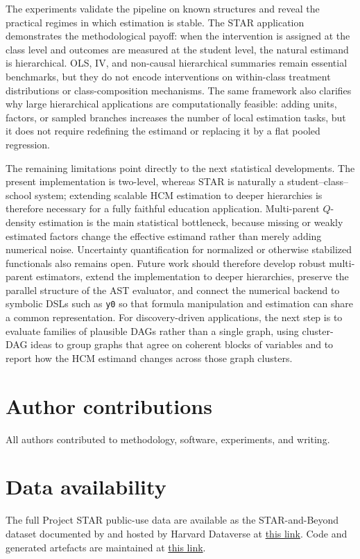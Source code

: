 \documentclass[unnumsec,webpdf,contemporary,large]{oup-authoring-template}%
\theoremstyle{thmstyleone}%
\theoremstyle{thmstyletwo}%
\theoremstyle{thmstylethree}%
\begin{document}
The experiments validate the pipeline on known structures and reveal the practical regimes in which estimation is stable.
The STAR application demonstrates the methodological payoff: when the intervention is assigned at the class level and outcomes are measured at the student level, the natural estimand is hierarchical.
OLS, IV, and non-causal hierarchical summaries remain essential benchmarks, but they do not encode interventions on within-class treatment distributions or class-composition mechanisms.
The same framework also clarifies why large hierarchical applications are computationally feasible: adding units, factors, or sampled branches increases the number of local estimation tasks, but it does not require redefining the estimand or replacing it by a flat pooled regression.

The remaining limitations point directly to the next statistical developments.
The present implementation is two-level, whereas STAR is naturally a student--class--school system; extending scalable HCM estimation to deeper hierarchies is therefore necessary for a fully faithful education application.
Multi-parent $Q$-density estimation is the main statistical bottleneck, because missing or weakly estimated factors change the effective estimand rather than merely adding numerical noise.
Uncertainty quantification for normalized or otherwise stabilized functionals also remains open.
Future work should therefore develop robust multi-parent estimators, extend the implementation to deeper hierarchies, preserve the parallel structure of the AST evaluator, and connect the numerical backend to symbolic DSLs such as \texttt{y0} so that formula manipulation and estimation can share a common representation. For discovery-driven applications, the next step is to evaluate families of plausible DAGs rather than a single graph, using cluster-DAG ideas to group graphs that agree on coherent blocks of variables and to report how the HCM estimand changes across those graph clusters.

\section*{Author contributions}
All authors contributed to methodology, software, experiments, and writing.

\section*{Data availability}
The full Project STAR public-use data are available as the STAR-and-Beyond dataset documented by \citet{Achilles2008} and hosted by Harvard Dataverse at \href{https://doi.org/10.7910/DVN/SIWH9F}{this link}. Code and generated artefacts are maintained at \href{https://github.com/AI-vidence/hierarchicalcausalmodels}{this link}.
\end{document}
